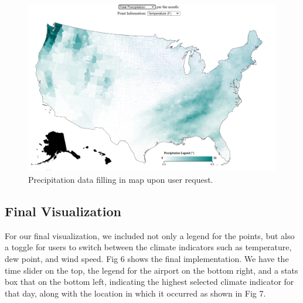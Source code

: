 \documentclass[10pt,twocolumn,twoside]{opticajnl}
\begin{document}
\begin{figure}
	\centering
	\includegraphics[scale=0.25]{images/precMap.png}
	\caption{Precipitation data filling in map upon user request.}
\end{figure}

\subsection {Final Visualization}

For our final visualization, we included not only a legend for the points, but also a toggle for users to switch between the climate indicators such as temperature, dew point, and wind speed. Fig 6 shows the final implementation. We have the time slider on the top, the legend for the airport on the bottom right, and a stats box that on the bottom left, indicating the highest selected climate indicator for that day, along with the location in which it occurred as shown in Fig 7.
\end{document}
